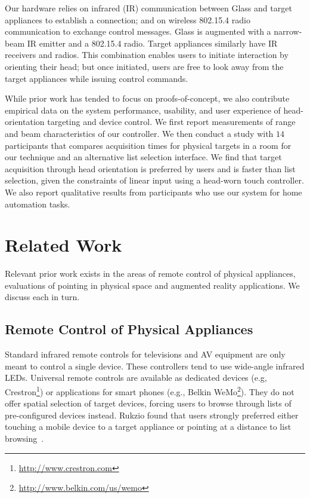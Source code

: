\documentclass{sigchi}
\begin{document}
Our hardware relies on infrared (IR) communication between Glass and target appliances to establish a connection; and on wireless 802.15.4 radio communication to exchange control messages.  Glass is augmented with a narrow-beam IR emitter and a 802.15.4 radio. Target appliances similarly have IR receivers and radios. This combination enables users to initiate interaction by orienting their head; but once initiated, users are free to look away from the target appliances while issuing control commands.

While prior work has tended to focus on proofs-of-concept, we also contribute empirical data on the system performance, usability, and user experience of head-orientation targeting and device control. We first report measurements of range and beam characteristics of our controller. We then conduct a study with $14$ participants that compares acquisition times for physical targets in a room for our technique and an alternative list selection interface. We find that target acquisition through head orientation is preferred by users and is faster than list selection, given the constraints of linear input using a head-worn touch controller. We also report qualitative results from participants who use our system for home automation tasks.


\section{Related Work}
Relevant prior work exists in the areas of remote control of physical appliances, evaluations of pointing in physical space and augmented reality applications. We discuss each in turn.

\subsection{Remote Control of Physical Appliances}
Standard infrared remote controls for televisions and AV equipment are only meant to control a single device. These controllers tend to use wide-angle infrared LEDs. Universal remote controls are available as dedicated devices (e.g, Crestron\footnote{\url{http://www.crestron.com}}) or applications for smart phones (e.g., Belkin WeMo\footnote{\url{http://www.belkin.com/us/wemo}}). They do not offer spatial selection of target devices, forcing users to browse through lists of pre-configured devices instead. Rukzio found that users strongly preferred either touching a mobile device to a target appliance or pointing at a distance to list browsing~\cite{rukzio_experimental_2006}.
\end{document}
